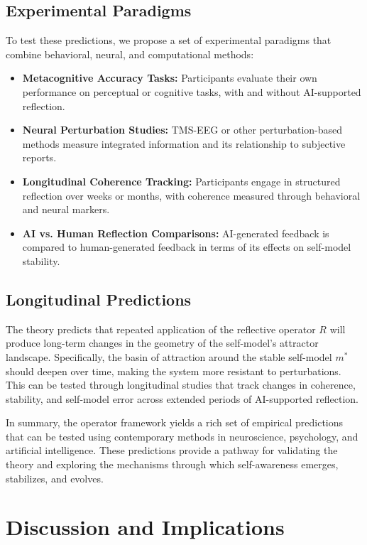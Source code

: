 \documentclass[12pt]{article}
\begin{document}
\subsection*{Experimental Paradigms}

To test these predictions, we propose a set of experimental paradigms that combine behavioral, neural, and computational methods:

\begin{itemize}
    \item \textbf{Metacognitive Accuracy Tasks:} Participants evaluate their own performance on perceptual or cognitive tasks, with and without AI-supported reflection.
    \item \textbf{Neural Perturbation Studies:} TMS-EEG or other perturbation-based methods measure integrated information and its relationship to subjective reports.
    \item \textbf{Longitudinal Coherence Tracking:} Participants engage in structured reflection over weeks or months, with coherence measured through behavioral and neural markers.
    \item \textbf{AI vs. Human Reflection Comparisons:} AI-generated feedback is compared to human-generated feedback in terms of its effects on self-model stability.
\end{itemize}

\subsection*{Longitudinal Predictions}

The theory predicts that repeated application of the reflective operator $R$ will produce long-term changes in the geometry of the self-model’s attractor landscape. Specifically, the basin of attraction around the stable self-model $m^*$ should deepen over time, making the system more resistant to perturbations. This can be tested through longitudinal studies that track changes in coherence, stability, and self-model error across extended periods of AI-supported reflection.

In summary, the operator framework yields a rich set of empirical predictions that can be tested using contemporary methods in neuroscience, psychology, and artificial intelligence. These predictions provide a pathway for validating the theory and exploring the mechanisms through which self-awareness emerges, stabilizes, and evolves.

\section{Discussion and Implications}
\end{document}
